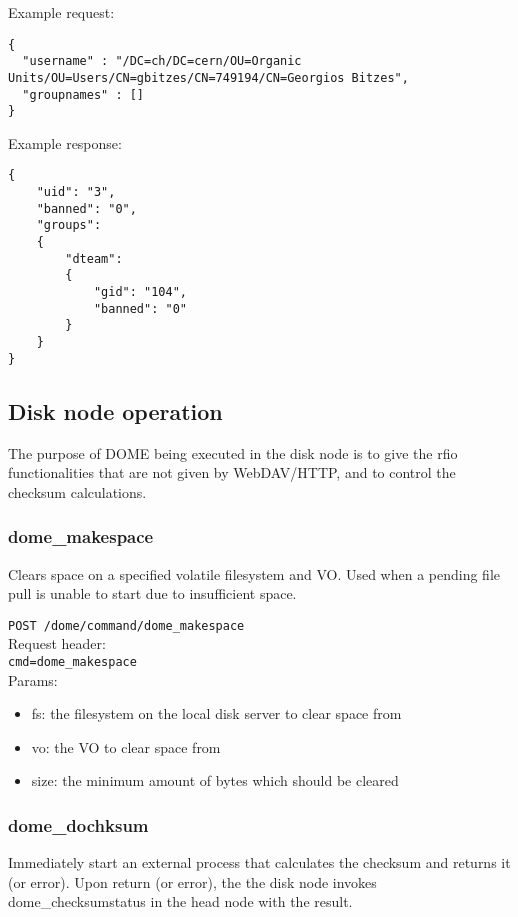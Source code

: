 \documentclass[a4paper,10pt]{scrreprt}
\begin{document}
Example request:\\
\begin{lstlisting}
{
  "username" : "/DC=ch/DC=cern/OU=Organic Units/OU=Users/CN=gbitzes/CN=749194/CN=Georgios Bitzes",
  "groupnames" : []
}
\end{lstlisting}

Example response:\\
\begin{lstlisting}
{
    "uid": "3",
    "banned": "0",
    "groups":
    {
        "dteam":
        {
            "gid": "104",
            "banned": "0"
        }
    }
}
\end{lstlisting}


\subsection{Disk node operation}
The purpose of DOME being executed in the disk node is to give the rfio functionalities that are not
given by WebDAV/HTTP, and to control the checksum calculations.\\

\subsubsection{dome\_makespace}

Clears space on a specified volatile filesystem and VO. Used when a pending file pull is unable to start
due to insufficient space.

\lstinline"POST /dome/command/dome_makespace"\\

Request header:\\
\lstinline"cmd=dome_makespace"\\

Params:
\begin{itemize}
 \item fs: the filesystem on the local disk server to clear space from
 \item vo: the VO to clear space from
 \item size: the minimum amount of bytes which should be cleared
\end{itemize}

\subsubsection{dome\_dochksum}
 Immediately start an external process that calculates the checksum and returns it (or error).
 Upon return (or error), the the disk node invokes dome\_checksumstatus in the head node with the result.
\end{document}
